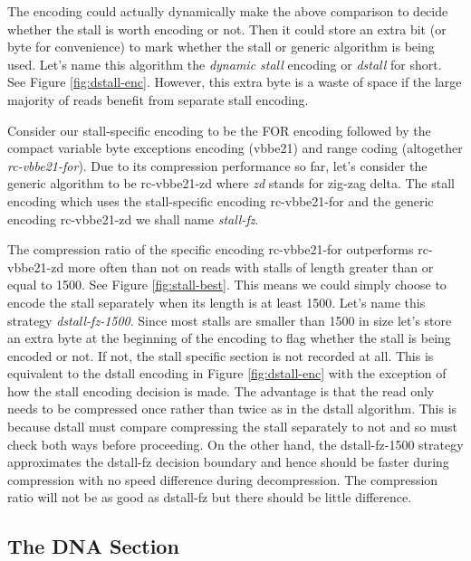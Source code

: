 

The encoding could actually dynamically make the above comparison to decide
whether the stall is worth encoding or not. Then it could store an extra bit (or
byte for convenience) to mark whether the stall or generic algorithm is being
used. Let's name this algorithm the \textit{dynamic stall} encoding or
\textit{dstall} for short. See Figure \ref{fig:dstall-enc}. However, this extra
byte is a waste of space if the large majority of reads benefit from separate
stall encoding.



Consider our stall-specific encoding to be the FOR encoding followed by the
compact variable byte exceptions encoding (vbbe21) and range coding (altogether
\textit{rc-vbbe21-for}). Due to its compression performance so far, let's
consider the generic algorithm to be rc-vbbe21-zd where \textit{zd} stands for
zig-zag delta. The stall encoding which uses the stall-specific encoding
rc-vbbe21-for and the generic encoding rc-vbbe21-zd we shall name
\textit{stall-fz}.

The compression ratio of the specific encoding rc-vbbe21-for outperforms
rc-vbbe21-zd more often than not on reads with stalls of length greater than or
equal to 1500. See Figure \ref{fig:stall-best}. This means we could simply
choose to encode the stall separately when its length is at least 1500. Let's
name this strategy \textit{dstall-fz-1500}. Since most stalls are smaller than
1500 in size let's store an extra byte at the beginning of the encoding to flag
whether the stall is being encoded or not. If not, the stall specific section is
not recorded at all. This is equivalent to the dstall encoding in Figure
\ref{fig:dstall-enc} with the exception of how the stall encoding decision is
made. The advantage is that the read only needs to be compressed once rather
than twice as in the dstall algorithm. This is because dstall must compare
compressing the stall separately to not and so must check both ways before
proceeding. On the other hand, the dstall-fz-1500 strategy approximates the
dstall-fz decision boundary and hence should be faster during compression with
no speed difference during decompression. The compression ratio will not be as
good as dstall-fz but there should be little difference.

%


\subsection{The DNA Section}


